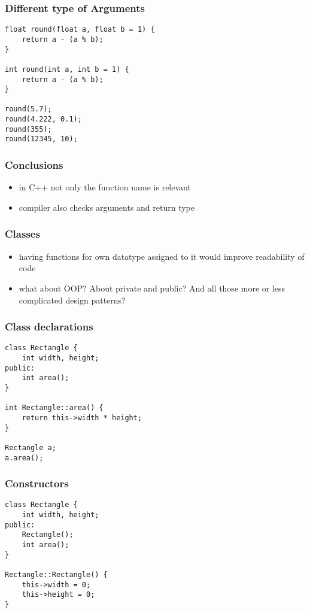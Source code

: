 \begin{frame}[fragile]
    \frametitle{Different type of Arguments}
    \begin{lstlisting}
float round(float a, float b = 1) {
    return a - (a % b);
}

int round(int a, int b = 1) {
    return a - (a % b);
}

round(5.7);
round(4.222, 0.1);
round(355);
round(12345, 10);
    \end{lstlisting}
\end{frame}

\begin{frame}[fragile]
    \frametitle{Conclusions}
    \begin{itemize}
        \item in C++ not only the function name is relevant
        \item compiler also checks arguments and return type
    \end{itemize}
\end{frame}

\begin{frame}[fragile]
    \frametitle{Classes}
    \begin{itemize}
        \item having functions for own datatype assigned to it would improve readability of code
        \item what about OOP? About private and public? And all those more or less complicated design patterns?
    \end{itemize}
\end{frame}

\begin{frame}[fragile]
    \frametitle{Class declarations}
    \begin{lstlisting}
class Rectangle {
    int width, height;
public:
    int area();
}

int Rectangle::area() {
    return this->width * height;
}

Rectangle a;
a.area();
    \end{lstlisting}
\end{frame}

\begin{frame}[fragile]
    \frametitle{Constructors}
    \begin{lstlisting}
class Rectangle {
    int width, height;
public:
    Rectangle();
    int area();
}

Rectangle::Rectangle() {
    this->width = 0;
    this->height = 0;
}

    \end{lstlisting}
\end{frame}

